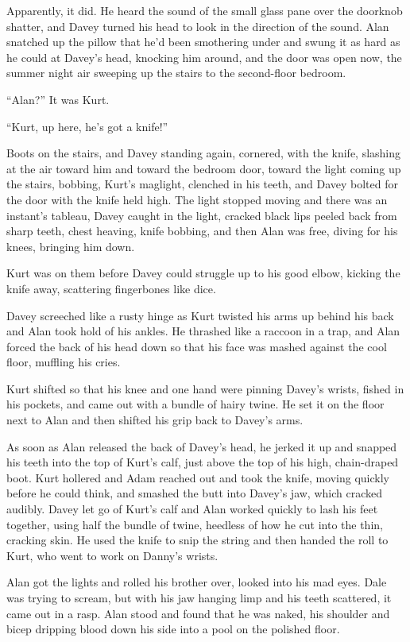 \documentclass{article}
\begin{document}
Apparently, it did.  He heard the sound of the small glass pane over
the doorknob shatter, and Davey turned his head to look in the
direction of the sound.  Alan snatched up the pillow that he'd been
smothering under and swung it as hard as he could at Davey's head,
knocking him around, and the door was open now, the summer night air
sweeping up the stairs to the second-floor bedroom.

``Alan?'' It was Kurt.

``Kurt, up here, he's got a knife!''

Boots on the stairs, and Davey standing again, cornered, with the
knife, slashing at the air toward him and toward the bedroom door,
toward the light coming up the stairs, bobbing, Kurt's maglight,
clenched in his teeth, and Davey bolted for the door with the knife
held high.  The light stopped moving and there was an instant's
tableau, Davey caught in the light, cracked black lips peeled back
from sharp teeth, chest heaving, knife bobbing, and then Alan was
free, diving for his knees, bringing him down.

Kurt was on them before Davey could struggle up to his good elbow,
kicking the knife away, scattering fingerbones like dice.

Davey screeched like a rusty hinge as Kurt twisted his arms up behind
his back and Alan took hold of his ankles.  He thrashed like a raccoon
in a trap, and Alan forced the back of his head down so that his face
was mashed against the cool floor, muffling his cries.

Kurt shifted so that his knee and one hand were pinning Davey's
wrists, fished in his pockets, and came out with a bundle of hairy
twine.  He set it on the floor next to Alan and then shifted his grip
back to Davey's arms.

As soon as Alan released the back of Davey's head, he jerked it up and
snapped his teeth into the top of Kurt's calf, just above the top of
his high, chain-draped boot.  Kurt hollered and Adam reached out and
took the knife, moving quickly before he could think, and smashed the
butt into Davey's jaw, which cracked audibly.  Davey let go of Kurt's
calf and Alan worked quickly to lash his feet together, using half the
bundle of twine, heedless of how he cut into the thin, cracking skin. 
He used the knife to snip the string and then handed the roll to Kurt,
who went to work on Danny's wrists.

Alan got the lights and rolled his brother over, looked into his mad
eyes.  Dale was trying to scream, but with his jaw hanging limp and
his teeth scattered, it came out in a rasp.  Alan stood and found that
he was naked, his shoulder and bicep dripping blood down his side into
a pool on the polished floor.
\end{document}
